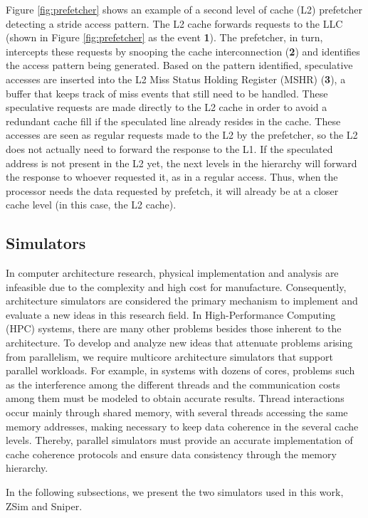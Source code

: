 \documentclass[AMA,final,STIX1COL]{WileyNJD-v2}
\begin{document}
Figure \ref{fig:prefetcher} shows an example of a second level of cache (L2) prefetcher detecting a stride access pattern.
The L2 cache forwards requests to the LLC (shown in Figure \ref{fig:prefetcher} as the event \textbf{1}).
The prefetcher, in turn, intercepts these requests by snooping the cache interconnection (\textbf{2}) and identifies the access pattern being generated.
Based on the pattern identified, speculative accesses are inserted into the L2 Miss Status Holding Register (MSHR) (\textbf{3}), a buffer that keeps track of miss events that still need to be handled.
These speculative requests are made directly to the L2 cache in order to avoid a redundant cache fill if the speculated line already resides in the cache.
These accesses are seen as regular requests made to the L2 by the prefetcher, so the L2 does not actually need to forward the response to the L1.
If the speculated address is not present in the L2 yet, the next levels in the hierarchy will forward the response to whoever requested it, as in a regular access.
Thus, when the processor needs the data requested by prefetch, it will already be at a closer cache level (in this case, the L2 cache).

\subsection{Simulators}

In computer architecture research, physical implementation and analysis are infeasible due to the complexity and high cost for manufacture. 
Consequently, architecture simulators are considered the primary mechanism to implement and evaluate a new ideas in this research field.
In High-Performance Computing (HPC) systems, there are many other problems besides those inherent to the architecture.
To develop and analyze new ideas that attenuate problems arising from parallelism, we require multicore architecture simulators that support parallel workloads.
For example, in systems with dozens of cores, problems such as the interference among the different threads and the communication costs among them must be modeled to obtain accurate results.
Thread interactions occur mainly through shared memory, with several threads accessing the same memory addresses, making necessary to keep data coherence in the several cache levels.
Thereby, parallel simulators must provide an accurate implementation of cache coherence protocols and ensure data consistency through the memory hierarchy.

In the following subsections, we present the two simulators used in this work, ZSim\cite{sanchez2013zsim} and Sniper\cite{carlson2014aeohmcm}.
\end{document}
